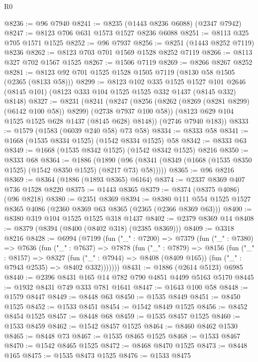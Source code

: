 \begin{lexlean}{R0}
\begin{coremodule}
@8236 := @96 @7940
@8241 := @8235 (@1443 @8236 @6088) (@2347 @7942)
@8247 := @8123 @706 @631 @1573 @1527 @8236 @6088
@8251 := @8113 @325 @705 @1571 @1525
@8252 := @96 @7937
@8256 := @8251 (@1443 @8252 @7119) @8236
@8262 := @8123 @703 @701 @1569 @1528 @8252 @7119
@8266 := @8113 @327 @702 @1567 @1525
@8267 := @1506 @7119
@8269 := @8266 @8267 @8252
@8281 := @8123 @92 @701 @1525 @1528 @1505 @7119 (@8130 @58 @1505 (@2365 (@8133 @58)))
@8299 := @8123
    @102
    @335
    @1525
    @1527
    @101
    @2646
    (@8145 @101)
    (@8123 @333 @104 @1525 @1525 @332 @1437 (@8145 @332) @8148)
@8327 := @8231
    (@8241
      (@8247
        (@8256 (@8262 (@8269 (@8281 @8299) (@6142 @100 @58)) @8299) (@2738 @7937 @100 @58))
        (@8123 @629 @104 @1525 @1525 @628 @1437 (@8145 @628) @8148))
      (@2746 @7940 @183))
@8333 := @1579 (@1583 (@6039 @240 @58) @73 @58)
@8334 := @8333 @58
@8341 := @1668 (@1535 @8334 @1525) (@1542 @8334 @1525) @58
@8342 := @8333 @63
@8349 := @1668 (@1535 @8342 @1525) (@1542 @8342 @1525) @8216
@8350 := @8333 @68
@8364 := @1886
    (@1890 (@96 (@8341 (@8349 (@1668 (@1535 @8350 @1525) (@1542 @8350 @1525) (@8217 @73) @58)))))
@8365 := @96 @8216
@8369 := @8364 (@1886 (@1893 @8365) @6164)
@8374 := @2337 @8369 @407 @736 @1528 @8220
@8375 := @1443 @8365
@8379 := @8374 (@8375 @4086) (@96 @8218)
@8380 := @2351 @8369
@8394 := @8380 @111 @554 @1525 @1527 @8365 @4086 (@2360 @8369 @63 @8365 (@2365 (@2366 @8369 @63)))
@8400 := @8380 @319 @104 @1525 @1525 @318 @1437
@8402 := @2379 @8369 @14
@8408 := @8379 (@8394 (@8400 (@8402 @318) (@2385 @8369)))
@8409 := @3318 @8216
@8428 := @6994
    (@7199
      (fun ("_" : @7200) =>
      @7379
        (fun ("_" : @7380) =>
        @7636
          (fun ("_" : @7637) =>
          @7878
            (fun ("_" : @7879) =>
            @8156
              (fun ("_" : @8157) =>
              @8327
                (fun ("_" : @7944) => @8408 (@8409 @165))
                (fun ("_" : @7943 @2535) => @8402 @332)))))))
@8431 := @1886 (@2614 @5123) @6985
@8440 := @2396 @8431 @165 @14 @782 @790 @4851 @4499 @5163 @5170
@8445 := @1932 @8431 @749 @333 @781 @1641
@8447 := @1643 @100 @58
@8448 := @1579 @8447
@8449 := @8448 @63
@8450 := @1535 @8449
@8451 := @8450 @1525
@8452 := @1533 @8451
@8454 := @1542 @8449 @1525
@8456 := @8452 @8454 @1525
@8457 := @8448 @68
@8459 := @1535 @8457 @1525
@8460 := @1533 @8459
@8462 := @1542 @8457 @1525
@8464 := @8460 @8462 @1530
@8465 := @8448 @73
@8467 := @1535 @8465 @1525
@8468 := @1533 @8467
@8470 := @1542 @8465 @1525
@8472 := @8468 @8470 @1525
@8473 := @8448 @165
@8475 := @1535 @8473 @1525
@8476 := @1533 @8475

\end{coremodule}
\end{lexlean}
